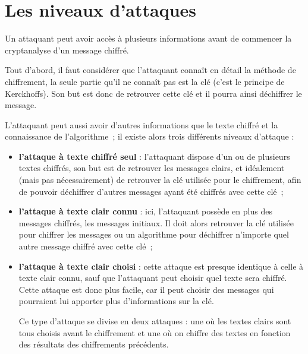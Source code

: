 \section{Les niveaux d'attaques}
Un attaquant peut avoir accès à plusieurs informations avant de
commencer la crypt\-analyse d'un message chiffré.

Tout d'abord, il faut considérer que l'attaquant connaît en détail
la méthode de chiffrement, la seule partie qu'il ne connaît pas
est la clé (c'est le principe de
Kerckhoffs). Son but est donc de
retrouver cette clé et il pourra ainsi déchiffrer le message.

L'attaquant peut aussi avoir d'autres informations que le texte
chiffré et la connaissance de l'algorithme~; il existe alors trois
différents niveaux d'attaque :

\begin{itemize}
  \item {\sffamily\textbf{l'attaque à texte chiffré seul}} :
    l'attaquant dispose d'un ou de plusieurs textes chiffrés, son but
    est de retrouver les messages clairs, et idéalement (mais pas
    nécessairement) de retrouver la clé utilisée pour le chiffrement,
    afin de pouvoir déchiffrer d'autres messages ayant été chiffrés
    avec cette clé~;

  \item {\sffamily\textbf{l'attaque à texte clair connu}} :
    ici, l'attaquant possède en plus des messages chiffrés, les
    messages initiaux. Il doit alors retrouver la clé utilisée pour 
    chiffrer les messages ou un algorithme pour déchiffrer n'importe
    quel autre message chiffré avec cette clé~;

  \item {\sffamily\textbf{l'attaque à texte clair choisi}} :
    cette attaque est presque identique à celle à texte clair connu,
    sauf que l'attaquant peut choisir quel texte sera chiffré. Cette
    attaque est donc plus facile, car il peut choisir des messages qui
    pourraient lui apporter plus d'informations sur la clé.

    Ce type d'attaque se divise en deux attaques : une où les textes
    clairs sont tous choisis avant le chiffrement et une où on
    chiffre des textes en fonction des résultats des chiffrements
    précédents.

\end{itemize}
